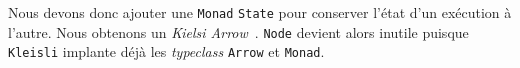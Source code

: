 \documentclass{llncs}
\newcommand{\Arr}{\lstinline{Arrow} }
\newcommand{\Arrp}{\lstinline{Arrow}. }
\newcommand{\Arrs}{\lstinline{Arrow}s }
\begin{document}
Nous devons donc ajouter une \lstinline{Monad} \lstinline{State} pour conserver l'état d'un exécution à l'autre.
Nous obtenons un \emph{Kielsi Arrow}~\cite{Hughes00}.
\lstinline{Node} devient alors inutile puisque \lstinline{Kleisli} implante déjà les
\emph{typeclass} \Arr et \lstinline{Monad}.






\end{document}
